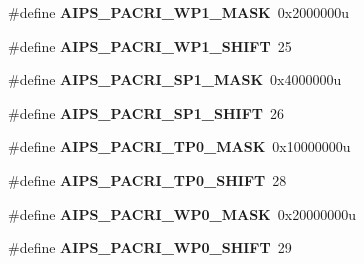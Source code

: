 \begin{DoxyCompactItemize}
\item 
\hypertarget{group___a_i_p_s___register___masks_ga2066be7a51afdec01b811bed88f0bdbe}{}\#define {\bfseries A\+I\+P\+S\+\_\+\+P\+A\+C\+R\+I\+\_\+\+W\+P1\+\_\+\+M\+A\+S\+K}~0x2000000u\label{group___a_i_p_s___register___masks_ga2066be7a51afdec01b811bed88f0bdbe}

\item 
\hypertarget{group___a_i_p_s___register___masks_gac135a5f861bdf3228c81b7f16a800e47}{}\#define {\bfseries A\+I\+P\+S\+\_\+\+P\+A\+C\+R\+I\+\_\+\+W\+P1\+\_\+\+S\+H\+I\+F\+T}~25\label{group___a_i_p_s___register___masks_gac135a5f861bdf3228c81b7f16a800e47}

\item 
\hypertarget{group___a_i_p_s___register___masks_ga7ca164d2f33178f4aed31fd5d62296af}{}\#define {\bfseries A\+I\+P\+S\+\_\+\+P\+A\+C\+R\+I\+\_\+\+S\+P1\+\_\+\+M\+A\+S\+K}~0x4000000u\label{group___a_i_p_s___register___masks_ga7ca164d2f33178f4aed31fd5d62296af}

\item 
\hypertarget{group___a_i_p_s___register___masks_ga246f4e35b609e9445b386265483c6dea}{}\#define {\bfseries A\+I\+P\+S\+\_\+\+P\+A\+C\+R\+I\+\_\+\+S\+P1\+\_\+\+S\+H\+I\+F\+T}~26\label{group___a_i_p_s___register___masks_ga246f4e35b609e9445b386265483c6dea}

\item 
\hypertarget{group___a_i_p_s___register___masks_gae7fc50bf35e262b9543a490b6d91370a}{}\#define {\bfseries A\+I\+P\+S\+\_\+\+P\+A\+C\+R\+I\+\_\+\+T\+P0\+\_\+\+M\+A\+S\+K}~0x10000000u\label{group___a_i_p_s___register___masks_gae7fc50bf35e262b9543a490b6d91370a}

\item 
\hypertarget{group___a_i_p_s___register___masks_ga33dce6026ec6a9fef299d71c0d8c16bd}{}\#define {\bfseries A\+I\+P\+S\+\_\+\+P\+A\+C\+R\+I\+\_\+\+T\+P0\+\_\+\+S\+H\+I\+F\+T}~28\label{group___a_i_p_s___register___masks_ga33dce6026ec6a9fef299d71c0d8c16bd}

\item 
\hypertarget{group___a_i_p_s___register___masks_ga38b6146379ddb37dc4dd7d6e138ee5c9}{}\#define {\bfseries A\+I\+P\+S\+\_\+\+P\+A\+C\+R\+I\+\_\+\+W\+P0\+\_\+\+M\+A\+S\+K}~0x20000000u\label{group___a_i_p_s___register___masks_ga38b6146379ddb37dc4dd7d6e138ee5c9}

\item 
\hypertarget{group___a_i_p_s___register___masks_ga626539c0aef04a3456f7c32a4157c953}{}\#define {\bfseries A\+I\+P\+S\+\_\+\+P\+A\+C\+R\+I\+\_\+\+W\+P0\+\_\+\+S\+H\+I\+F\+T}~29\label{group___a_i_p_s___register___masks_ga626539c0aef04a3456f7c32a4157c953}


\end{DoxyCompactItemize}
